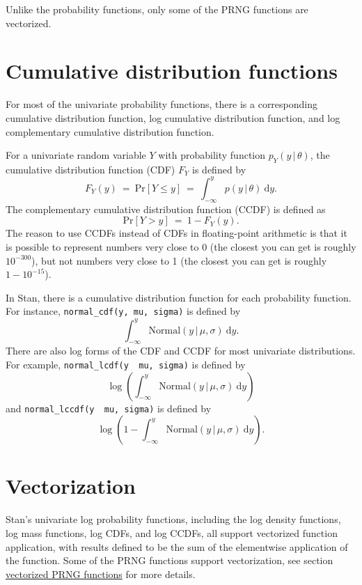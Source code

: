 \documentclass[
  10pt,
]{book}
\begin{document}
Unlike the probability functions, only some of the PRNG functions are
vectorized.

\hypertarget{cumulative-distribution-functions}{%
\section{Cumulative distribution functions}\label{cumulative-distribution-functions}}

For most of the univariate probability functions, there is a
corresponding cumulative distribution function, log cumulative
distribution function, and log complementary cumulative distribution
function.

For a univariate random variable \(Y\) with probability function \(p_Y(y \, | \, \theta)\), the cumulative distribution function (CDF) \(F_Y\) is
defined by \[ F_Y(y) \ = \ \text{Pr}[Y \le y] \ = \ \int_{-\infty}^y p(y
\, | \, \theta) \ \text{d}y. \] The complementary cumulative
distribution function (CCDF) is defined as \[ \text{Pr}[Y > y] \ =
\ 1 - F_Y(y). \] The reason to use CCDFs instead of CDFs in
floating-point arithmetic is that it is possible to represent numbers
very close to 0 (the closest you can get is roughly \(10^{-300}\)), but
not numbers very close to 1 (the closest you can get is roughly \(1 - 10^{-15}\)).

In Stan, there is a cumulative distribution function for each
probability function. For instance, \texttt{normal\_cdf(y,\ mu,\ sigma)} is
defined by \[ \int_{-\infty}^y \text{Normal}(y \, | \, \mu, \sigma) \
\text{d}y. \] There are also log forms of the CDF and CCDF for most
univariate distributions. For example, \texttt{normal\_lcdf(y\ \textbar{}\ mu,\ sigma)}
is defined by \[ \log \left( \int_{-\infty}^y \text{Normal}(y \, | \,
\mu, \sigma) \   \text{d}y \right) \] and \texttt{normal\_lccdf(y\ \textbar{}\ mu,\ sigma)} is defined by \[ \log \left( 1 - \int_{-\infty}^y
\text{Normal}(y \, | \, \mu, \sigma) \   \text{d}y \right). \]

\hypertarget{vectorization}{%
\section{Vectorization}\label{vectorization}}

Stan's univariate log probability functions, including the log density
functions, log mass functions, log CDFs, and log CCDFs, all support
vectorized function application, with results defined to be the sum of
the elementwise application of the function. Some of the PRNG
functions support vectorization, see section \protect\hyperlink{prng-vectorization}{vectorized PRNG functions}
for more details.
\end{document}
